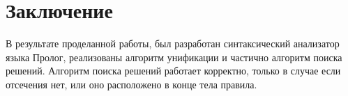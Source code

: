\chapter{Заключение}
В результате проделанной работы, был разработан синтаксический анализатор языка Пролог, реализованы алгоритм унификации и частично алгоритм поиска решений.
Алгоритм поиска решений работает корректно, только в случае если отсечения нет, или оно расположено в конце тела правила.